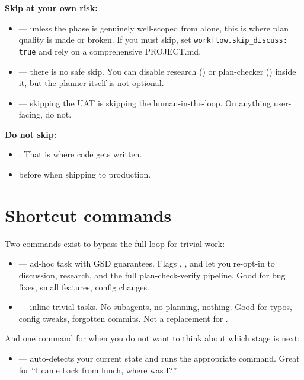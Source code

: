 \documentclass[11pt,letterpaper,openany]{book}
\begin{document}
\textbf{Skip at your own risk:}
\begin{itemize}[itemsep=2pt]
  \item {} --- unless the phase is genuinely well-scoped from  alone, this is where plan quality is made or broken. If you must skip, set \texttt{workflow.skip\_discuss: true} and rely on a comprehensive PROJECT.md.
  \item {} --- there is no safe skip. You can disable research () or plan-checker () inside it, but the planner itself is not optional.
  \item {} --- skipping the UAT is skipping the human-in-the-loop. On anything user-facing, do not.
\end{itemize}

\textbf{Do not skip:}
\begin{itemize}[itemsep=2pt]
  \item {}. That is where code gets written.
  \item {} before  when shipping to production.
\end{itemize}

\section{Shortcut commands}

Two commands exist to bypass the full loop for trivial work:

\begin{itemize}[itemsep=2pt]
  \item {} --- ad-hoc task with GSD guarantees. Flags , , and  let you re-opt-in to discussion, research, and the full plan-check-verify pipeline. Good for bug fixes, small features, config changes.
  \item {} --- inline trivial tasks. No subagents, no planning, nothing. Good for typos, config tweaks, forgotten commits. Not a replacement for .
\end{itemize}

And one command for when you do not want to think about which stage is next:

\begin{itemize}[itemsep=2pt]
  \item {} --- auto-detects your current state and runs the appropriate command. Great for ``I came back from lunch, where was I?''
\end{itemize}
\end{document}
